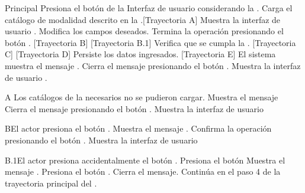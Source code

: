 \begin{UCtrayectoria}{Principal}
	\UCpaso[\UCactor] Presiona el botón de la Interfaz de usuario  considerando la  .
	\UCpaso Carga el catálogo de modalidad descrito en la .[Trayectoria A]
	\UCpaso Muestra la interfaz de usuario .
	\UCpaso[\UCactor] Modifica los campos deseados.
	\UCpaso[\UCactor] Termina la operación presionando el botón . [Trayectoria B] [Trayectoria B.1]
	\UCpaso Verifica que se cumpla la . [Trayectoria C] [Trayectoria D] 
	\UCpaso Persiste los datos ingresados. [Trayectoria E]
	\UCpaso El sistema muestra el mensaje .
	\UCpaso[\UCactor] Cierra el mensaje presionando el botón .
	\UCpaso Muestra la interfaz de usuario .
\end{UCtrayectoria}
\begin{UCtrayectoriaA}{A}{ Los catálogos de la  necesarios no se pudieron cargar.}
    \UCpaso Muestra el mensaje 
    \UCpaso[\UCactor] Cierra el mensaje presionando el botón .
    \UCpaso Muestra la interfaz de usuario 
\end{UCtrayectoriaA}

\begin{UCtrayectoriaA}{B}{El actor presiona el botón .}
	\UCpaso Muestra el mensaje .
	\UCpaso[\UCactor] Confirma la operación presionando el botón .
	\UCpaso Muestra la interfaz de usuario 
\end{UCtrayectoriaA}

\begin{UCtrayectoriaA}{B.1}{El actor presiona accidentalmente el botón .}
	\UCpaso[\UCactor] Presiona el botón 
	\UCpaso Muestra el mensaje .
	\UCpaso[\UCactor] Presiona el botón .
	\UCpaso Cierra el mensaje.
	\UCpaso Continúa en el paso 4 de la trayectoria principal del .
\end{UCtrayectoriaA}

